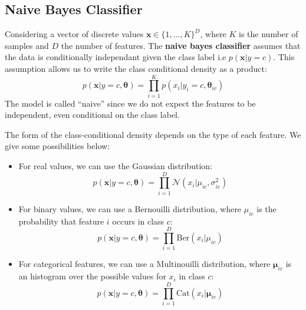 \documentclass[12pt]{report}
\begin{document}
        \subsection{Naive Bayes Classifier}
            Considering a vector of discrete values $\boldsymbol{x} \in \{1, \dots, K\}^D$, where $K$ is the number of samples and $D$ the number of features.
            The \textbf{naive bayes classifier} assumes that the data is conditionally independant given the class label i.e $p(\boldsymbol{x}|y=c)$.
            This assumption allows us to write the class conditional density as a product:
            \begin{equation}
                p(\boldsymbol{x} | y = c, \boldsymbol{\theta}) = \prod_{i=1}^{K}p(x_i | y_i = c, \boldsymbol{\theta}_{ic})
            \end{equation}
            The model is called “naive” since we do not expect the features to be independent, even conditional on the class label.
            
            The form of the class-conditional density depends on the type of each feature. We give some possibilities below:
            \begin{itemize}
                \item For real values, we can use the Gaussian distribution:
                \begin{equation}
                    p(\boldsymbol{x} | y = c, \boldsymbol{\theta}) = \prod_{i=1}^{D} \mathcal{N}(x_i| \mu_{ic}, \sigma_{ic}^2)
                \end{equation}
                \item For binary values, we can use a Bernouilli distribution, where $\mu_{ic}$ is the probability that feature $i$ occurs in class $c$:
                \begin{equation}
                    p(\boldsymbol{x} | y = c, \boldsymbol{\theta}) = \prod_{i=1}^{D} \text{Ber}(x_i | \mu_{ic}) 
                \end{equation}
                \item For categorical features, we can use a Multinouilli distribution, where $\boldsymbol{\mu}_{ic}$ is an histogram over the possible values for $x_i$ in class $c$:
                \begin{equation}
                    p(\boldsymbol{x} | y = c, \boldsymbol{\theta}) = \prod_{i=1}^{D}\text{Cat}(x_i | \boldsymbol{\mu}_{ic})
                \end{equation}
                
            \end{itemize}
    
\end{document}
